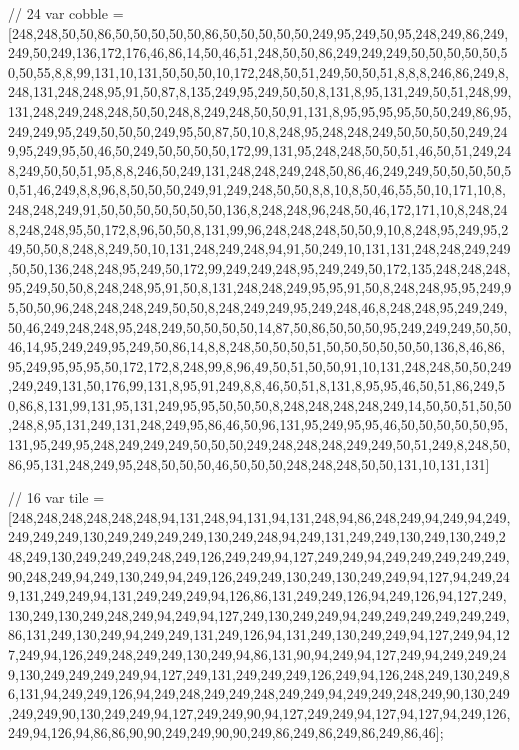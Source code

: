 // 24
var cobble = [248,248,50,50,86,50,50,50,50,50,86,50,50,50,50,50,249,95,249,50,95,248,249,86,249,249,50,249,136,172,176,46,86,14,50,46,51,248,50,50,86,249,249,249,50,50,50,50,50,50,50,55,8,8,99,131,10,131,50,50,50,10,172,248,50,51,249,50,50,51,8,8,8,246,86,249,8,248,131,248,248,95,91,50,87,8,135,249,95,249,50,50,8,131,8,95,131,249,50,51,248,99,131,248,249,248,248,50,50,248,8,249,248,50,50,91,131,8,95,95,95,95,50,50,249,86,95,249,249,95,249,50,50,50,249,95,50,87,50,10,8,248,95,248,248,249,50,50,50,50,249,249,95,249,95,50,46,50,249,50,50,50,50,172,99,131,95,248,248,50,50,51,46,50,51,249,248,249,50,50,51,95,8,8,246,50,249,131,248,248,249,248,50,86,46,249,249,50,50,50,50,50,51,46,249,8,8,96,8,50,50,50,249,91,249,248,50,50,8,8,10,8,50,46,55,50,10,171,10,8,248,248,249,91,50,50,50,50,50,50,50,136,8,248,248,96,248,50,46,172,171,10,8,248,248,248,248,95,50,172,8,96,50,50,8,131,99,96,248,248,248,50,50,9,10,8,248,95,249,95,249,50,50,8,248,8,249,50,10,131,248,249,248,94,91,50,249,10,131,131,248,248,249,249,50,50,136,248,248,95,249,50,172,99,249,249,248,95,249,249,50,172,135,248,248,248,95,249,50,50,8,248,248,95,91,50,8,131,248,248,249,95,95,91,50,8,248,248,95,95,249,95,50,50,96,248,248,248,249,50,50,8,248,249,249,95,249,248,46,8,248,248,95,249,249,50,46,249,248,248,95,248,249,50,50,50,50,14,87,50,86,50,50,50,95,249,249,249,50,50,46,14,95,249,249,95,249,50,86,14,8,8,248,50,50,50,51,50,50,50,50,50,50,136,8,46,86,95,249,95,95,95,50,172,172,8,248,99,8,96,49,50,51,50,50,91,10,131,248,248,50,50,249,249,249,131,50,176,99,131,8,95,91,249,8,8,46,50,51,8,131,8,95,95,46,50,51,86,249,50,86,8,131,99,131,95,131,249,95,95,50,50,50,8,248,248,248,248,249,14,50,50,51,50,50,248,8,95,131,249,131,248,249,95,86,46,50,96,131,95,249,95,95,46,50,50,50,50,50,95,131,95,249,95,248,249,249,249,50,50,50,249,248,248,248,249,249,50,51,249,8,248,50,86,95,131,248,249,95,248,50,50,50,46,50,50,50,248,248,248,50,50,131,10,131,131]

// 16
var tile = [248,248,248,248,248,248,94,131,248,94,131,94,131,248,94,86,248,249,94,249,94,249,249,249,249,130,249,249,249,249,130,249,248,94,249,131,249,249,130,249,130,249,248,249,130,249,249,249,248,249,126,249,249,94,127,249,249,94,249,249,249,249,249,90,248,249,94,249,130,249,94,249,126,249,249,130,249,130,249,249,94,127,94,249,249,131,249,249,94,131,249,249,249,94,126,86,131,249,249,126,94,249,126,94,127,249,130,249,130,249,248,249,94,249,94,127,249,130,249,249,94,249,249,249,249,249,249,86,131,249,130,249,94,249,249,131,249,126,94,131,249,130,249,249,94,127,249,94,127,249,94,126,249,248,249,249,130,249,94,86,131,90,94,249,94,127,249,94,249,249,249,130,249,249,249,249,94,127,249,131,249,249,249,126,249,94,126,248,249,130,249,86,131,94,249,249,126,94,249,248,249,249,248,249,249,94,249,249,248,249,90,130,249,249,249,90,130,249,249,94,127,249,249,90,94,127,249,249,94,127,94,127,94,249,126,249,94,126,94,86,86,90,90,249,249,90,90,249,86,249,86,249,86,249,86,46];


